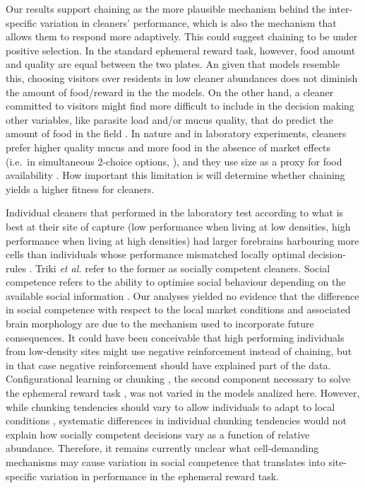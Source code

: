 \documentclass[]{rsos}%
\begin{document}
Our results support chaining as the more plausible mechanism behind the
inter-specific variation in cleaners' performance, which is also
the mechanism that allows them to respond more adaptively. This could
suggest chaining to be under positive selection. In the standard ephemeral
reward task, however, food amount and quality are equal between the
two plates. An given that models resemble this, choosing visitors over
residents in low cleaner abundances does not diminish the
amount of food/reward in the the models.
On the other hand, a cleaner committed to visitors might find more difficult
to include in the decision making other variables, like parasite load
and/or mucus quality, that do predict the amount of food in the field
\citep{roche_Client_2021}. In nature and in laboratory experiments, cleaners prefer
higher quality mucus and more food in the absence of market effects
(i.e.~in simultaneous 2-choice options,
\citep{triki_Fluctuations_2019, grutter_Cleaner_2004}), and they use size as a
proxy for food availability \citep{wismer_Cuebased_2019, grutter_Does_2005}.
How important this limitation is will determine whether chaining yields a higher
fitness for cleaners.

Individual cleaners that performed in the laboratory test according to what
is best at their site of capture (low performance when living at low densities,
high performance when living at high densities) had larger forebrains
harbouring more cells than individuals whose performance mismatched locally
optimal decision-rules \citep{triki_Brain_2020}. Triki \emph{et al.} refer to the
former as socially competent cleaners. Social competence refers to the
ability to optimise social behaviour depending on the available social
information \citep{taborsky_Social_2012a, bshary_Cooperation_2015, varela_Correlated_2020}. Our analyses yielded no
evidence that the difference in social competence with respect to the local
market conditions and associated brain morphology are due to the mechanism
used to incorporate future consequences. It could have been conceivable that
high performing individuals from low-density sites might use negative
reinforcement instead of chaining, but in that case negative reinforcement
should have explained part of the data. Configurational learning or
chunking \citep{sutherland_Configural_1989, miller_Magical_1956}, the second component
necessary to solve the ephemeral reward task \citep{quinones_Reinforcement_2019}, was
not varied in the models analized here. However, while chunking tendencies
should vary to allow individuals to adapt to local conditions
\citep{prat_Modelling_2022, kolodny_Evolution_2014}, systematic differences
in individual chunking tendencies would not explain how socially
competent decisions vary as a function of relative abundance.
Therefore, it remains currently unclear what cell-demanding
mechanisms may cause variation in social competence that
translates into site-specific variation in performance in the
ephemeral reward task.
\end{document}

